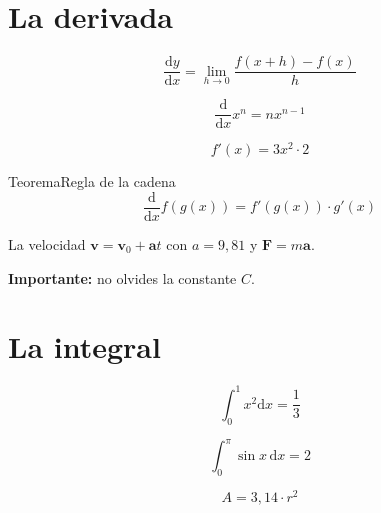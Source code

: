 \documentclass[11pt]{article}
\title{#1}\author{#2}\date{}%
\begin{document}

\section*{La derivada}

\begin{equation}
\frac{\mathrm{d}y}{\mathrm{d}x}= \lim_{h \to 0}\frac{f(x + h) - f(x)}{h}
\end{equation}

\begin{equation}
\frac{\mathrm{d}}{\mathrm{d}x}x^{n} = n x^{n-1}
\end{equation}

\begin{equation}
f'(x) = 3x^{2} \cdot 2
\end{equation}

\begin{cltheorem}{Teorema}{Regla de la cadena}
\begin{equation}
\frac{\mathrm{d}}{\mathrm{d}x}f(g(x)) = f'(g(x)) \cdot g'(x)
\end{equation}
\end{cltheorem}

La velocidad \(\mathbf{v}= \mathbf{v}_{0} + \mathbf{a}t\) con \(a = 9{,}81\) y \(\mathbf{F}= m \mathbf{a}\).

\textcolor{clRed}{\textbf{Importante: }}no olvides la constante \textcolor{clBlue}{\(C\)}.

\section*{La integral}

\begin{equation}
\int_{0}^{1} x^{2} \mathrm{d}x = \frac{1}{3}
\end{equation}

\begin{equation}
\int_{0}^{\pi}\sin x \, \mathrm{d}x = 2
\end{equation}

\begin{equation}
A = 3{,}14 \cdot r^{2}
\end{equation}
\end{document}
